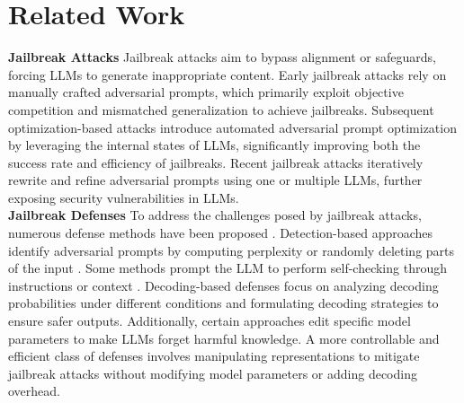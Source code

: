 \section{Related Work}
\textbf{Jailbreak Attacks}\quad
Jailbreak attacks aim to bypass alignment or safeguards, forcing LLMs to generate inappropriate content. Early jailbreak attacks \cite{wei2023jailbroken, yong2024lowresource, yuan2024cipher} rely on manually crafted adversarial prompts, which primarily exploit objective competition and mismatched generalization to achieve jailbreaks. Subsequent optimization-based attacks \cite{zou2023universal, liu2024autodan, paulus2024advprompter} introduce automated adversarial prompt optimization by leveraging the internal states of LLMs, significantly improving both the success rate and efficiency of jailbreaks. Recent jailbreak attacks \cite{chao2024jailbreaking, mehrotra2024tree, ding2024wolf} iteratively rewrite and refine adversarial prompts using one or multiple LLMs, further exposing security vulnerabilities in LLMs.
\vspace{0.2\baselineskip}
\\ \textbf{Jailbreak Defenses}\quad 
To address the challenges posed by jailbreak attacks, numerous defense methods have been proposed \cite{robey2024smoothllm, kumar2025certifying}. Detection-based approaches identify adversarial prompts by computing perplexity \cite{alon2023detecting} or randomly deleting parts of the input \cite{cao2024rallm}. Some methods prompt the LLM to perform self-checking through instructions \cite{phute2024selfexam, xie2023defending, zhang2024gp} or context \cite{zhou2024icag}. Decoding-based defenses \cite{xu-etal-2024-safedecoding, liu2024aed} focus on analyzing decoding probabilities under different conditions and formulating decoding strategies to ensure safer outputs. Additionally, certain approaches \cite{zhao2024LED, ouyang2025layer} edit specific model parameters to make LLMs forget harmful knowledge. A more controllable and efficient class of defenses \cite{li2025revisiting, shen2025JA} involves manipulating representations to mitigate jailbreak attacks without modifying model parameters or adding decoding overhead. 
